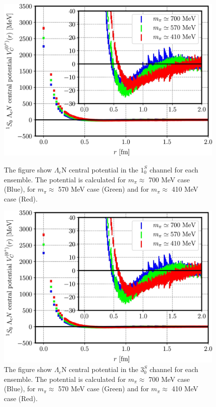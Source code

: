 \documentclass[12pt,a4paper]{book}
\begin{document}
	\begin{figure}
		\centering
		\begin{minipage}{0.45\textwidth}
			\centering
			\includegraphics[width=0.74 \linewidth]{pictures/radial_potential_1s.jpg}
			\caption{ The figure show $\Lambda_c$N central potential in the $ 1^S_0$ channel for each ensemble. The potential is calculated for $m_\pi \approx$ 700 MeV case (Blue), for $m_\pi \approx$ 570 MeV case (Green) and for $m_\pi \approx$ 410 MeV case (Red).}
			\label{fig:radial_potential_1s}
			
		\end{minipage}
		\begin{minipage}{0.5\textwidth}
			\centering
			\includegraphics[width=0.74 \linewidth]{pictures/radial_potential_1s.jpg}
			\caption{ The figure show $\Lambda_c$N central potential in the $ 3^S_0$ channel for each ensemble. The potential is calculated for $m_\pi \approx$ 700 MeV case (Blue), for $m_\pi \approx$  570 MeV case (Green) and for $m_\pi \approx$  410 MeV case (Red).}
			\label{fig:radial_potential_3s}
		\end{minipage}%
	\end{figure}
	
\end{document}
